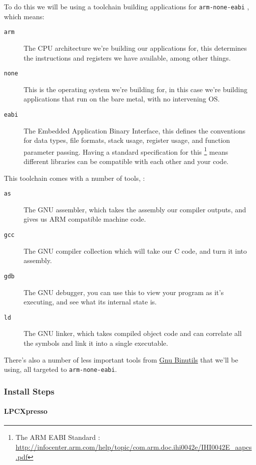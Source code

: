 \documentclass[]{article}
\begin{document}
To do this we will be using a toolchain building applications for
\texttt{arm-none-eabi} , which means:

\begin{description}
\item[\texttt{arm}]
The CPU architecture we're building our applications for, this
determines the instructions and registers we have available, among other
things.
\item[\texttt{none}]
This is the operating system we're building for, in this case we're
building applications that run on the bare metal, with no intervening
OS.
\item[\texttt{eabi}]
The Embedded Application Binary Interface, this defines the conventions
for data types, file formats, stack usage, register usage, and function
parameter passing. Having a standard specification for this \footnote{The
  ARM EABI Standard :
  \url{http://infocenter.arm.com/help/topic/com.arm.doc.ihi0042e/IHI0042E_aapcs.pdf}}
means different libraries can be compatible with each other and your
code.
\end{description}

This toolchain comes with a number of tools, :

\begin{description}
\item[\texttt{as}]
The GNU assembler, which takes the assembly our compiler outputs, and
gives us ARM compatible machine code.
\item[\texttt{gcc}]
The GNU compiler collection which will take our C code, and turn it into
assembly.
\item[\texttt{gdb}]
The GNU debugger, you can use this to view your program as it's
executing, and see what its internal state is.
\item[\texttt{ld}]
The GNU linker, which takes compiled object code and can correlate all
the symbols and link it into a single executable.
\end{description}

There's also a number of less important tools from
\href{http://www.gnu.org/software/binutils/}{Gnu Binutils} that we'll be
using, all targeted to \texttt{arm-none-eabi}.

\subsubsection{Install Steps}

\paragraph{LPCXpresso}
\end{document}
